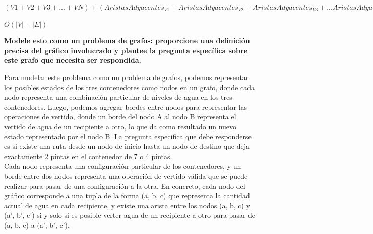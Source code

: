 \documentclass{article}
\begin{document}
$(V1+V2+V3+...+VN)+(AristasAdyacentes_{V1}+AristasAdyacentes_{V2}+AristasAdyacentes_{V3}+...AristasAdyacentes_{VN})$\\


\begin{center}
  \begin{minipage}{0.7\linewidth} %
    \begin{algorithm}[H] 
      \SetAlgoLined
    \end{algorithm}
  \end{minipage}
\end{center}

$O(|V|+|E|)$

\begin{question}
  \textbf{Modele esto como un problema de grafos: proporcione una definición precisa del gráfico involucrado y plantee la pregunta específica sobre este grafo que necesita ser respondida.}\\
\end{question}

Para modelar este problema como un problema de grafos, podemos representar los posibles estados de los tres contenedores como nodos en un grafo, donde cada nodo representa una combinación particular de niveles de agua en los tres contenedores. Luego, podemos agregar bordes entre nodos para representar las operaciones de vertido, donde un borde del nodo A al nodo B representa el vertido de agua de un recipiente a otro, lo que da como resultado un nuevo estado representado por el nodo B. La pregunta específica que debe responderse es si existe una ruta desde un nodo de inicio hasta un nodo de destino que deja exactamente 2 pintas en el contenedor de 7 o 4 pintas.\\

Cada nodo representa una configuración particular de los contenedores, y un borde entre dos nodos representa una operación de vertido válida que se puede realizar para pasar de una configuración a la otra. En concreto, cada nodo del gráfico corresponde a una tupla de la forma (a, b, c) que representa la cantidad actual de agua en cada recipiente, y existe una arista entre los nodos (a, b, c) y (a', b', c') si y solo si es posible verter agua de un recipiente a otro para pasar de (a, b, c) a (a', b', c').\\
\end{document}
